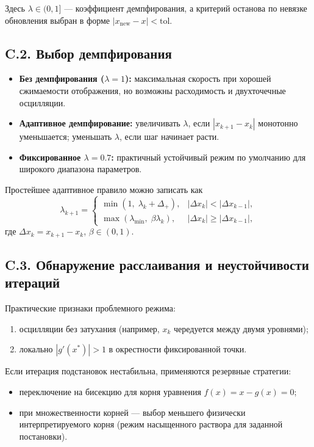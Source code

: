 \documentclass[11pt]{article}
\begin{document}
Здесь $\lambda\in(0,1]$ --- коэффициент демпфирования, а критерий останова по невязке обновления выбран в форме $|x_{\text{new}}-x|<\mathrm{tol}$.

\subsection*{C.2. Выбор демпфирования}

\begin{itemize}
  \item \textbf{Без демпфирования ($\lambda=1$):} максимальная скорость при хорошей сжимаемости отображения, но возможны расходимость и двухточечные осцилляции.
  \item \textbf{Адаптивное демпфирование:} увеличивать $\lambda$, если $|x_{k+1}-x_k|$ монотонно уменьшается; уменьшать $\lambda$, если шаг начинает расти.
  \item \textbf{Фиксированное $\lambda=0.7$:} практичный устойчивый режим по умолчанию для широкого диапазона параметров.
\end{itemize}

Простейшее адаптивное правило можно записать как
\begin{equation*}
\lambda_{k+1}=
\begin{cases}
\min(1,\;\lambda_k+\Delta_+), & |\Delta x_k|<|\Delta x_{k-1}|,\\
\max(\lambda_{\min},\;\beta\lambda_k), & |\Delta x_k|\ge |\Delta x_{k-1}|,
\end{cases}
\end{equation*}
где $\Delta x_k=x_{k+1}-x_k$, $\beta\in(0,1)$.

\subsection*{C.3. Обнаружение расслаивания и неустойчивости итераций}

Практические признаки проблемного режима:
\begin{enumerate}
  \item осцилляции без затухания (например, $x_k$ чередуется между двумя уровнями);
  \item локально $|g'(x^*)|>1$ в окрестности фиксированной точки.
\end{enumerate}

Если итерация подстановок нестабильна, применяются резервные стратегии:
\begin{itemize}
  \item переключение на бисекцию для корня уравнения $f(x)=x-g(x)=0$;
  \item при множественности корней --- выбор меньшего физически интерпретируемого корня (режим насыщенного раствора для заданной постановки).
\end{itemize}
\end{document}
